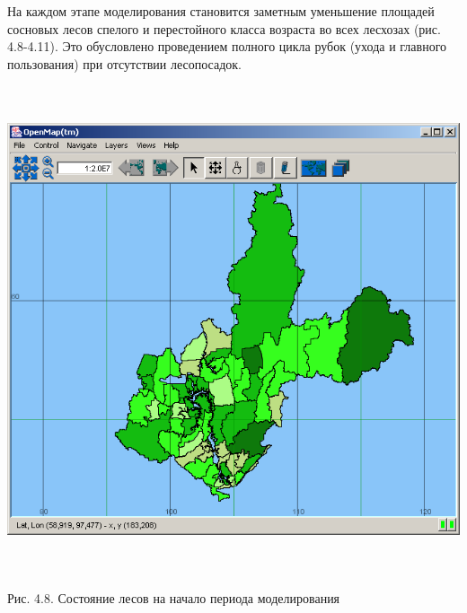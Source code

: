 \documentclass{article}
\begin{document}
На каждом этапе моделирования становится заметным 
уменьшение площадей сосновых лесов спелого 
и перестойного класса возраста во всех лесхозах 
(рис. 4.8-4.11). Это обусловлено проведением полного 
цикла рубок (ухода и главного пользования) при 
отсутствии лесопосадок.

\begin{center}
\includegraphics[width=452pt, height=407pt, keepaspectratio=true]{asyaDisser9_3-fig019.png}

Рис. 4.8. Состояние лесов на начало периода моделирования


\end{center}
\end{document}
